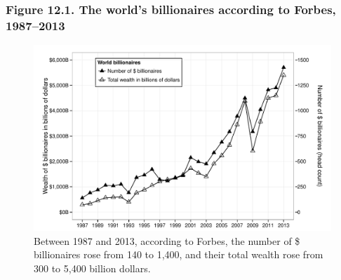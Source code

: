 \documentclass[t]{beamer}\usepackage[]{graphicx}\usepackage[]{color}
\newenvironment{knitrout}{}{} %
\begin{document}
\begin{frame}[label=Figure_12_1]
\frametitle{Figure 12.1. The world's billionaires according to Forbes, 1987--2013}
\begin{figure}[t]
\begin{minipage}[b]{\textwidth}
\centering

\begin{knitrout}\footnotesize
{}\color{fgcolor}

{\centering \includegraphics[width=1\linewidth]{figures/bw/Figure_12_1} 

}



\end{knitrout}
\caption{Between 1987 and 2013, according to Forbes, the number of \$ billionaires rose from 140 to 1,400, and their total wealth rose from 300 to 5,400 billion dollars.}
\end{minipage}
\end{figure}
\end{frame}
\end{document}
